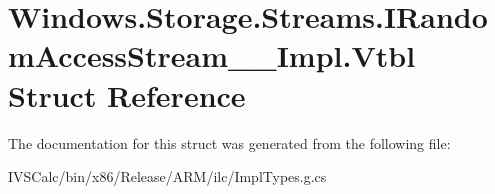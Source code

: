 \hypertarget{struct_windows_1_1_storage_1_1_streams_1_1_i_random_access_stream_____impl_1_1_vtbl}{}\section{Windows.\+Storage.\+Streams.\+I\+Random\+Access\+Stream\+\_\+\+\_\+\+Impl.\+Vtbl Struct Reference}
\label{struct_windows_1_1_storage_1_1_streams_1_1_i_random_access_stream_____impl_1_1_vtbl}


The documentation for this struct was generated from the following file\+:\begin{DoxyCompactItemize}
\item 
I\+V\+S\+Calc/bin/x86/\+Release/\+A\+R\+M/ilc/Impl\+Types.\+g.\+cs\end{DoxyCompactItemize}
